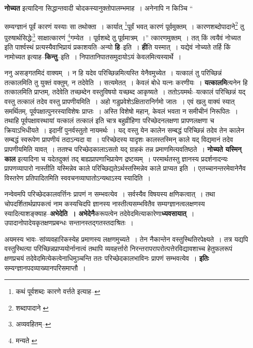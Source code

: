 \documentclass[article,12pt,a4paper]{memoir}
\begin{document}
	  \pstart \textbf{नोच्यत} इत्यादिना सिद्धान्तवादी चोदकस्यानुक्तोपालम्भमाह । अनेनापि न किञ्चि \leavevmode{} “
	  
	सम्यग्ज्ञानं पूर्वं कारणं यस्याः सा तथोक्ता । कार्यात् \footnote{कथं पूर्वशब्दः कारणे वर्त्तते इत्याह--\cite{dp-msD-n}}\-पूर्वं भवत् कारणं पूर्वमुक्तम् । कारणशब्दोपादाने\footnote{शब्दापादाने \cite{dp-msA} \cite{dp-msB}} तु पुरुषार्थसिद्धेः\footnote{अव्यवहितम्--\cite{dp-msD-n}} साक्षात्कारणं \footnote{मन्यते \cite{dp-msA} \cite{dp-edH}}\-गम्येत । पूर्वशब्दे तु पूर्वमात्रम् ।” त्कारणमुक्तम् । तत् किं त्वयैवं नोच्यत इति पार्श्वस्थं प्रत्यस्यैवाभिप्रायं प्रकाशयति--अन्यो \textbf{हि}--इति । \textbf{ही}ति यस्मात् । यद्येवं नोच्यते तर्हि किं नामोच्यत इत्याह--\textbf{किन्तु}--इति । निपातानिपातसमुदायोऽयं केवलमित्यस्यार्थे ।
	\pend
      

	  \pstart ननु असङ्गतमिदं वाक्यम् । न हि यदेव परिच्छिन्नमित्यस्ति येनैवमुच्येत । यत्कालं तु परिच्छिन्नं तत्कालमिति तु युक्तं वक्तुम्, न तदेवेति । सत्यमेतत् । केवलं बोधे यत्नः करणीयः । \textbf{यत्कालमि}त्यनेन हि तत्कालमिति प्राप्तम्, तदेवेति तच्छब्देन वस्तुविषयो यच्छब्द आकृष्यते । ततोऽयमर्थः--यत्कालं परिच्छिन्नं यद् वस्तु तत्कालं तदेव वस्तु प्रापणीयमिति । अहो गडुप्रवेशेऽक्षितारानिर्गमो जातः । एवं खलु वाक्यं स्यात् समर्थितम्, पूर्वपक्षात्पुनरस्याविशेषः प्राप्तः । अस्ति विशेषो महान्, केवलं भवता न समीचीनं निरूपितः । तथाहि पूर्वपक्षावस्थायां यत्कालं तत्कालं इति चात्र बहुव्रीहिणा परिच्छेदनलक्षणा प्रापणलक्षणा च क्रियाऽभिधीयते । इदानीं पुनर्वस्तुतो नायमर्थः । यद् वस्तु येन कालेन सम्बद्धं परिच्छिन्नं तदेव तेन कालेन सम्बद्धं स्वरूपेण प्रापणीयं तदाऽन्यदा वा । परिच्छेदस्य यादृशः कालस्तस्मिन् काले यद् विद्यमानं तदेव प्रापणीयमिति यावत् । ततश्च परिच्छेदका\leavevmode{}लाऽसतो यद् ग्राहकं तन्न प्रमाणमित्यवतिष्ठते । \textbf{नोच्यते यस्मिन् काल} इत्यादिना च यदेतदुक्तं तद् बाह्यप्रापणाभिप्रायेण द्रष्टव्यम् । परमार्थतस्तु ज्ञानस्य प्रदर्शनादन्यः प्रापणव्यापारो नास्तीति यस्मिन्नेव काले परिच्छिद्यतेऽर्थस्तस्मिन्नेव काले प्राप्यत इति । एतच्चानन्तरमेवानेनैव विस्तरेण प्रतिपादितमिति स्ववचनव्याघातोऽन्यथाऽस्य स्यादिति ।
	\pend
      

	  \pstart नन्वेवमपि परिच्छेदकालवर्त्तिनः प्रापणं न सम्भवत्येव । सर्वस्यैव विषयस्य क्षणिकत्वात् । तथा चोपदर्शितार्थप्रापकत्वं नाम कस्यचिदपि ज्ञानस्य नास्तीत्यसम्भवितैव सम्यग्ज्ञानत्वलक्षणस्य स्यादित्याशङ्क्याह--\textbf{अभेदेति । अभेदेनै}करूपत्वेन तदेवेदमित्याकारेणा\textbf{ध्यवसायात्} । उपादानोपादेयकृतक्षणप्रबन्धः सन्तानस्तद्गतस्तदाश्रितः ।
	\pend
      

	  \pstart अयमस्य भावः--सांव्यवहारिकस्येह प्रमाणस्य लक्षणमुच्यते । तेन नैकान्तेन वस्तुस्थितिरपेक्ष्यते । तत्र यद्यपि वस्तुस्थित्या परिच्छिन्नप्राप्ययोर्नानात्वं तथापि व्यवहर्त्तारो निरन्तरापरापरोत्पत्तेरविद्यावशाच्च हेतुफलरूपं क्षणप्रचयं तदेवेदमित्येकत्वेनाधिमुञ्चन्ति ततः परिच्छेदकालभाविनः प्रापणं सम्भवत्येव । \textbf{इतिः} सम्यग्ज्ञानपदव्याख्यानपरिसमाप्तौ ।
	\pend
      
\end{document}
